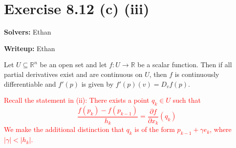 \documentclass{article}
\theoremstyle{plain} %
\numberwithin{thm}{section} %
\theoremstyle{definition}
\begin{document}
    \section*{Exercise 8.12 (c) (iii)}
    \textbf{Solvers:} Ethan

    \noindent\textbf{Writeup:} Ethan

    Let \(U \subseteq \mathbb{R}^n\) be an open set and let \(f: U \to \mathbb{R}\) be a scalar function. Then if all partial derivatives exist and are continuous on \(U\), then \(f\) is continuously differentiable and \(f'(p)\) is given by \(f'(p)(v) = D_v f(p)\).

    \textcolor{red}{Recall the statement in (ii): There exists a point \(q_k \in U\) such that
    \[
        \frac{f(p_k) - f(p_{k-1})}{h_k} = \frac{\partial f}{\partial x_k} (q_k)
    \]
    We make the additional distinction that \(q_k\) is of the form \(p_{k-1} + \gamma e_k\), where \(|\gamma| < |h_k|\).}
\end{document}
